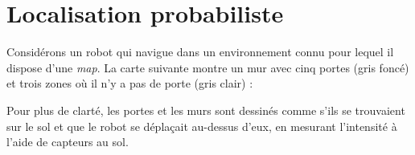 \section{Localisation probabiliste}\label{s.prob-local}

Considérons un robot qui navigue dans un environnement connu pour lequel il dispose d'une \emph{map}. La carte suivante montre un mur avec cinq portes (gris foncé) et trois zones où il n'y a pas de porte (gris clair) :

\begin{center}
\end{center}

Pour plus de clarté, les portes et les murs sont dessinés comme s'ils se trouvaient sur le sol et que le robot se déplaçait au-dessus d'eux, en mesurant l'intensité à l'aide de capteurs au sol.

